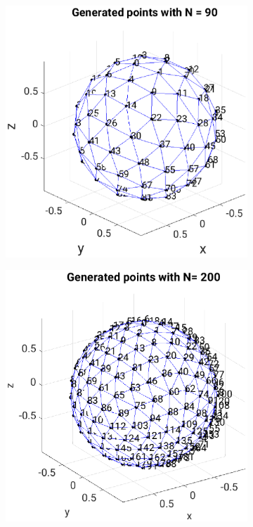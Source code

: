 \begin{figure}[H]
\begin{subfigure}[b]{0.48\textwidth}
         \includegraphics[width=1.2\textwidth]{Graphics/arbitrary_nomals90.eps}
         \label{fig:arbitary_n90}
     \end{subfigure}
         \hfill
     \begin{subfigure}[b]{0.48\textwidth}
         \centering
         \includegraphics[width=1.2\textwidth]{Graphics/arbitrary_nomals200.eps}

\end{subfigure}
\end{figure}

